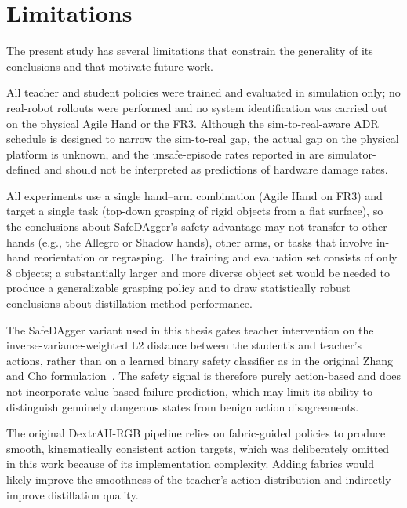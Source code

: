 \section{Limitations}%
\label{sec:limitations}%

The present study has several limitations that constrain the generality of its conclusions and that motivate future work.

All teacher and student policies were trained and evaluated in simulation only; no real-robot rollouts were performed and no system identification was carried out on the physical Agile Hand or the FR3.
Although the sim-to-real-aware \ac{ADR} schedule is designed to narrow the sim-to-real gap, the actual gap on the physical platform is unknown, and the unsafe-episode rates reported in  are simulator-defined and should not be interpreted as predictions of hardware damage rates.

All experiments use a single hand--arm combination (Agile Hand on FR3) and target a single task (top-down grasping of rigid objects from a flat surface), so the conclusions about SafeDAgger's safety advantage may not transfer to other hands (e.g., the Allegro or Shadow hands), other arms, or tasks that involve in-hand reorientation or regrasping.
The training and evaluation set consists of only 8 objects; a substantially larger and more diverse object set would be needed to produce a generalizable grasping policy and to draw statistically robust conclusions about distillation method performance.

The SafeDAgger variant used in this thesis gates teacher intervention on the inverse-variance-weighted L2 distance between the student's and teacher's actions, rather than on a learned binary safety classifier as in the original Zhang and Cho formulation~\cite{Zhang2016}.
The safety signal is therefore purely action-based and does not incorporate value-based failure prediction, which may limit its ability to distinguish genuinely dangerous states from benign action disagreements.

The original DextrAH-RGB pipeline relies on fabric-guided policies to produce smooth, kinematically consistent action targets, which was deliberately omitted in this work because of its implementation complexity.
Adding fabrics would likely improve the smoothness of the teacher's action distribution and indirectly improve distillation quality.

